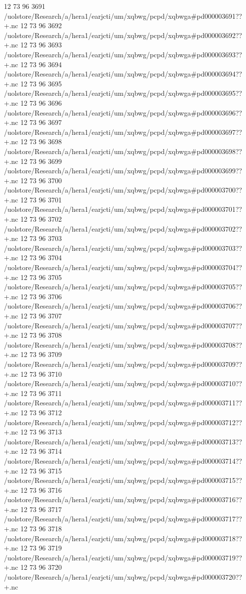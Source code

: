 12 73 96
3691
/uolstore/Research/a/hera1/earjcti/um/xqbwg/pcpd/xqbwga#pd000003691??+.nc
12 73 96
3692
/uolstore/Research/a/hera1/earjcti/um/xqbwg/pcpd/xqbwga#pd000003692??+.nc
12 73 96
3693
/uolstore/Research/a/hera1/earjcti/um/xqbwg/pcpd/xqbwga#pd000003693??+.nc
12 73 96
3694
/uolstore/Research/a/hera1/earjcti/um/xqbwg/pcpd/xqbwga#pd000003694??+.nc
12 73 96
3695
/uolstore/Research/a/hera1/earjcti/um/xqbwg/pcpd/xqbwga#pd000003695??+.nc
12 73 96
3696
/uolstore/Research/a/hera1/earjcti/um/xqbwg/pcpd/xqbwga#pd000003696??+.nc
12 73 96
3697
/uolstore/Research/a/hera1/earjcti/um/xqbwg/pcpd/xqbwga#pd000003697??+.nc
12 73 96
3698
/uolstore/Research/a/hera1/earjcti/um/xqbwg/pcpd/xqbwga#pd000003698??+.nc
12 73 96
3699
/uolstore/Research/a/hera1/earjcti/um/xqbwg/pcpd/xqbwga#pd000003699??+.nc
12 73 96
3700
/uolstore/Research/a/hera1/earjcti/um/xqbwg/pcpd/xqbwga#pd000003700??+.nc
12 73 96
3701
/uolstore/Research/a/hera1/earjcti/um/xqbwg/pcpd/xqbwga#pd000003701??+.nc
12 73 96
3702
/uolstore/Research/a/hera1/earjcti/um/xqbwg/pcpd/xqbwga#pd000003702??+.nc
12 73 96
3703
/uolstore/Research/a/hera1/earjcti/um/xqbwg/pcpd/xqbwga#pd000003703??+.nc
12 73 96
3704
/uolstore/Research/a/hera1/earjcti/um/xqbwg/pcpd/xqbwga#pd000003704??+.nc
12 73 96
3705
/uolstore/Research/a/hera1/earjcti/um/xqbwg/pcpd/xqbwga#pd000003705??+.nc
12 73 96
3706
/uolstore/Research/a/hera1/earjcti/um/xqbwg/pcpd/xqbwga#pd000003706??+.nc
12 73 96
3707
/uolstore/Research/a/hera1/earjcti/um/xqbwg/pcpd/xqbwga#pd000003707??+.nc
12 73 96
3708
/uolstore/Research/a/hera1/earjcti/um/xqbwg/pcpd/xqbwga#pd000003708??+.nc
12 73 96
3709
/uolstore/Research/a/hera1/earjcti/um/xqbwg/pcpd/xqbwga#pd000003709??+.nc
12 73 96
3710
/uolstore/Research/a/hera1/earjcti/um/xqbwg/pcpd/xqbwga#pd000003710??+.nc
12 73 96
3711
/uolstore/Research/a/hera1/earjcti/um/xqbwg/pcpd/xqbwga#pd000003711??+.nc
12 73 96
3712
/uolstore/Research/a/hera1/earjcti/um/xqbwg/pcpd/xqbwga#pd000003712??+.nc
12 73 96
3713
/uolstore/Research/a/hera1/earjcti/um/xqbwg/pcpd/xqbwga#pd000003713??+.nc
12 73 96
3714
/uolstore/Research/a/hera1/earjcti/um/xqbwg/pcpd/xqbwga#pd000003714??+.nc
12 73 96
3715
/uolstore/Research/a/hera1/earjcti/um/xqbwg/pcpd/xqbwga#pd000003715??+.nc
12 73 96
3716
/uolstore/Research/a/hera1/earjcti/um/xqbwg/pcpd/xqbwga#pd000003716??+.nc
12 73 96
3717
/uolstore/Research/a/hera1/earjcti/um/xqbwg/pcpd/xqbwga#pd000003717??+.nc
12 73 96
3718
/uolstore/Research/a/hera1/earjcti/um/xqbwg/pcpd/xqbwga#pd000003718??+.nc
12 73 96
3719
/uolstore/Research/a/hera1/earjcti/um/xqbwg/pcpd/xqbwga#pd000003719??+.nc
12 73 96
3720
/uolstore/Research/a/hera1/earjcti/um/xqbwg/pcpd/xqbwga#pd000003720??+.nc
